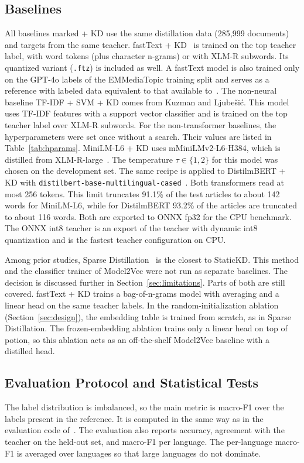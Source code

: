 \documentclass[journal]{IEEEtran}
\begin{document}
\subsection{Baselines}
\label{sec:baselines}
All baselines marked + KD use the same distillation data (285,999 documents) and targets from the same teacher. fastText + KD~\cite{joulin2017bag} is trained on the top teacher label, with word tokens (plus character n-grams) or with XLM-R subwords. Its quantized variant (\texttt{.ftz}) is included as well. A fastText model is also trained only on the GPT-4o labels of the EMMediaTopic training split and serves as a reference with labeled data equivalent to that available to~\cite{kuzman2025llm}. The non-neural baseline TF-IDF + SVM + KD comes from Kuzman and Ljube\v{s}i\'c. This model uses TF-IDF features with a support vector classifier and is trained on the top teacher label over XLM-R subwords. For the non-transformer baselines, the hyperparameters were set once without a search. Their values are listed in Table~\ref{tab:hparams}. MiniLM-L6 + KD uses mMiniLMv2-L6-H384, which is distilled from XLM-R-large~\cite{wang2021minilmv2}. The temperature $\tau\in\{1,2\}$ for this model was chosen on the development set. The same recipe is applied to DistilmBERT + KD with \texttt{distilbert-base-multilingual-cased}~\cite{sanh2019distilbert}. Both transformers read at most 256 tokens. This limit truncates 91.1\% of the test articles to about 142 words for MiniLM-L6, while for DistilmBERT 93.2\% of the articles are truncated to about 116 words. Both are exported to ONNX fp32 for the CPU benchmark. The ONNX int8 teacher is an export of the teacher with dynamic int8 quantization and is the fastest teacher configuration on CPU.

Among prior studies, Sparse Distillation~\cite{ye2022sparse} is the closest to StaticKD. This method and the classifier trainer of Model2Vec were not run as separate baselines. The decision is discussed further in Section~\ref{sec:limitations}. Parts of both are still covered. fastText + KD trains a bag-of-n-grams model with averaging and a linear head on the same teacher labels. In the random-initialization ablation (Section~\ref{sec:design}), the embedding table is trained from scratch, as in Sparse Distillation. The frozen-embedding ablation trains only a linear head on top of potion, so this ablation acts as an off-the-shelf Model2Vec baseline with a distilled head.

\subsection{Evaluation Protocol and Statistical Tests}
\label{sec:protocol}
The label distribution is imbalanced, so the main metric is macro-F1 over the labels present in the reference. It is computed in the same way as in the evaluation code of~\cite{kuzman2025llm}. The evaluation also reports accuracy, agreement with the teacher on the held-out set, and macro-F1 per language. The per-language macro-F1 is averaged over languages so that large languages do not dominate.
\end{document}
